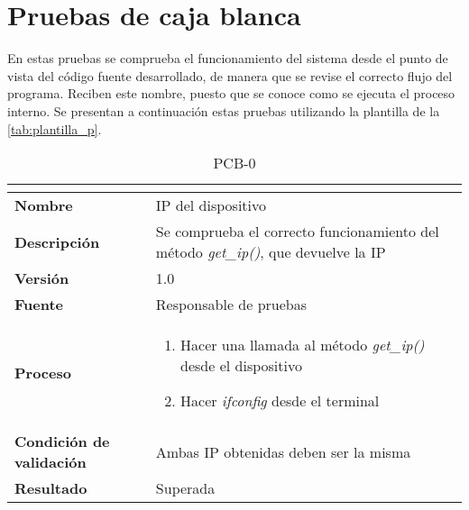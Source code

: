 \section{Pruebas de caja blanca}\label{sec:pruebas-de-caja-blanca}
En estas pruebas se comprueba el funcionamiento del sistema desde el punto de vista del código fuente desarrollado, de manera que se revise el correcto flujo del programa. Reciben este nombre, puesto que se conoce como se ejecuta el proceso interno. Se presentan a continuación estas pruebas utilizando la plantilla de la \autoref{tab:plantilla_p}. 

\newcount\pcb
{}
\begin{table}[H]
	\caption{PCB-0\number\pcb}
	\begin{tabular}{|l|p{}|}
		\hline
		\multicolumn{2}{|c|}{\cellcolor[HTML]{BFBFBF}{\color[HTML]{000000} \textbf{PCB-0\number\pcb}}} \\ \hline
		\textbf{Nombre}                  & IP del dispositivo                                                                        \\ \hline
		\textbf{Descripción}             & Se comprueba el correcto funcionamiento del método \textit{get\_ip()}, que devuelve la IP \\ \hline
		\textbf{Versión}                 & 1.0                                                                                       \\ \hline
		\textbf{Fuente}                  & Responsable de pruebas                                                                    \\ \hline
		\textbf{Proceso}                 & \begin{enumerate}
			\item Hacer una llamada al método \textit{get\_ip()} desde el dispositivo
			\item Hacer \textit{ifconfig} desde el terminal
		\end{enumerate}                                                                 \\ \hline
		\textbf{Condición de validación} & Ambas IP obtenidas deben ser la misma                                                     \\ \hline
		\textbf{Resultado}               & Superada                                                                                  \\ \hline
	\end{tabular}
\end{table}
